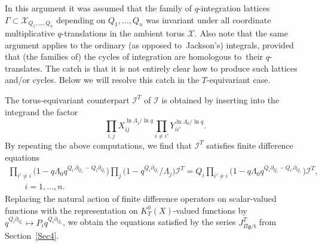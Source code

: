 \documentclass[pdftex]{sigma}
\numberwithin{equation}{section}
\def\I{\mathcal I}
\def\X{\mathcal X}
\def\p{\partial}
\begin{document}
In this argument it was assumed that the family of $q$-integration
lattices $\Gamma\subset \X_{Q_1,\dots,Q_n}$ depending on $Q_1,\dots,Q_n$ was invariant
under all coordinate multiplicative $q$-translations in the ambient torus $\X$.
Also note that the same argument applies to the ordinary (as opposed to~Jackson's)
integrals, provided that (the families of) the cycles of integration are homologous to~their $q$-translates. The catch is that it is not entirely clear how to produce
such lattices and/or cycles. Below we will resolve this catch in the $T$-equivariant case.

The torus-equivariant counterpart $\I^T$ of $\I$ is obtained by inserting into the integrand the factor
\[
\prod_{i,j}X_{ij}^{\ln \Lambda_j/\ln q} \prod_{i\neq i'} Y_{ii'}^{\ln \Lambda_0/\ln q}.
\]
By repeating the above computations, we find that $\I^T$ satisfies finite difference equations
\begin{gather*}
\prod_{i'\neq i}\big(1-q \Lambda_0 q^{Q_{i'}\p_{Q_{i'}}-Q_i\p_{Q_i}}\big) \prod_j\big(1-q^{Q_i\p_{Q_i}}/\Lambda_j\big) \I^T
 = Q_i\prod_{i'\neq i} \big(1-q\Lambda_0 q^{Q_i\p_{Q_i}-Q_{i'}\p_{Q_{i'}}}\big) \I^T,
 \\
 \qquad i=1,\dots, n.
\end{gather*}
Replacing the natural action of finite difference operators on scalar-valued functions with the representation on $K^0_T(X)$-valued functions by $q^{Q_i\p_{Q_i}}\mapsto P_iq^{Q_i\p_{Q_i}}$, we obtain the equations satisfied by the series $J^T_{\Pi\mathfrak{g}/\mathfrak{t}}$ from Section~\ref{Sec4}.
\end{document}
